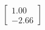 \documentclass[preview]{standalone}
\begin{document}
\begin{align*}
\begin{bmatrix} 1.00 \\ -2.66 \end{bmatrix}
\end{align*}
\end{document}
